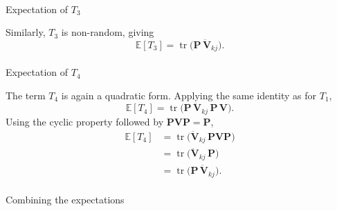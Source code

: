\documentclass[
  letterpaper,
  DIV=11,
  numbers=noendperiod]{scrartcl}
\makeatletter
\let\oldparagraph\paragraph
\renewcommand{\paragraph}{
    \@ifstar
      \xxxParagraphStar
      \xxxParagraphNoStar
  }
\newcommand{\xxxParagraphStar}[1]{\oldparagraph*{#1}\mbox{}}
\newcommand{\xxxParagraphNoStar}[1]{\oldparagraph{#1}\mbox{}}
\makeatother
\begin{document}
\paragraph{\texorpdfstring{Expectation of
\(T_3\)}{Expectation of T\_3}}\label{expectation-of-t_3}

Similarly, \(T_3\) is non-random, giving \begin{equation}
\mathbb{E}[T_3] = \operatorname{tr}\!\big( \symbf{P}\,\ddot{\symbf{V}}_{kj} \big).
\end{equation}

\paragraph{\texorpdfstring{Expectation of
\(T_4\)}{Expectation of T\_4}}\label{expectation-of-t_4}

The term \(T_4\) is again a quadratic form. Applying the same identity
as for \(T_1\), \begin{equation}
\mathbb{E}[T_4] = \operatorname{tr}\!\big( \symbf{P}\,\ddot{\symbf{V}}_{kj}\,\symbf{P} \, \symbf{V} \big).
\end{equation} Using the cyclic property followed by
\(\symbf{P}\symbf{V}\symbf{P} = \symbf{P}\), \begin{align}
\mathbb{E}[T_4] &= \operatorname{tr}\!\big( \ddot{\symbf{V}}_{kj}\,\symbf{P} \symbf{V} \symbf{P} \big) \\
&= \operatorname{tr}\!\big( \ddot{\symbf{V}}_{kj}\,\symbf{P} \big) \\
&= \operatorname{tr}\!\big( \symbf{P}\,\ddot{\symbf{V}}_{kj} \big).
\end{align}

\paragraph{Combining the expectations}\label{combining-the-expectations}
\end{document}
